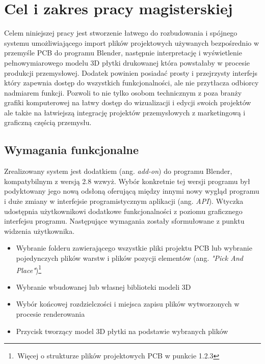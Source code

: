 \documentclass[brudnopis]{xmgr}
\begin{document}


\chapter{Cel i zakres pracy magisterskiej}

Celem niniejszej pracy jest stworzenie łatwego do rozbudowania i spójnego systemu umożliwiającego import plików projektowych używanych bezpośrednio w przemyśle PCB do programu Blender, następnie interpretację i wyświetlenie pełnowymiarowego modelu 3D płytki drukowanej która powstałaby w procesie produkcji przemysłowej. Dodatek powinien posiadać prosty i przejrzysty interfejs który zapewnia dostęp do wszystkich funkcjonalności, ale nie przytłacza odbiorcy nadmiarem funkcji. Pozwoli to nie tylko osobom technicznym z poza branży grafiki komputerowej na łatwy dostęp do wizualizacji i edycji swoich projektów ale także na łatwiejszą integrację projektów przemysłowych z marketingową i graficzną częścią przemysłu.

\section{Wymagania funkcjonalne}

Zrealizowany system jest dodatkiem (ang. \emph{add-on}) do programu Blender, kompatybilnym z wersją 2.8 wzwyż. Wybór konkretnie tej wersji programu był podyktowany jego nową odsłoną oferującą między innymi nowy wygląd programu i duże zmiany w interfejsie programistycznym aplikacji (ang. \emph{API}). Wtyczka udostępnia użytkownikowi dodatkowe funkcjonalności z poziomu graficznego interfejsu programu. Następujące wymagania zostały sformułowane z punktu widzenia użytkownika.
\begin{itemize}
\item Wybranie folderu zawierającego wszystkie pliki projektu PCB lub wybranie pojedynczych plików warstw i  plików pozycji elementów (ang. \emph{"Pick And Place"})\footnote{\,Więcej o strukturze plików projektowych PCB w punkcie 1.2.3}
\item Wybranie wbudowanej lub własnej biblioteki modeli 3D
\item Wybór końcowej rozdzielczości i miejsca zapisu plików wytworzonych w procesie renderowania
\item Przycisk tworzący model 3D płytki na podstawie wybranych plików
\end{itemize}
\end{document}
